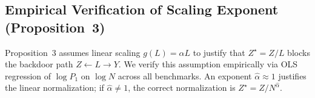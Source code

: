 \subsection{Empirical Verification of Scaling Exponent (Proposition~3)}
\label{sec:prop3_verification}

Proposition~3 assumes linear scaling $g(L) = \alpha L$ to justify that $Z^\star = Z/L$ blocks the backdoor path $Z \leftarrow L \rightarrow Y$. We verify this assumption empirically via OLS regression of $\log P_1$ on $\log N$ across all benchmarks. An exponent $\hat{\alpha} \approx 1$ justifies the linear normalization; if $\hat{\alpha} \neq 1$, the correct normalization is $Z^\star = Z / N^{\hat{\alpha}}$.

\begin{table}[ht]
\centering
\small
{}
\caption{\textbf{Empirical Scaling Exponent of 1D Persistence vs.\ Sequence Length.} OLS regression of $\log P_1$ on $\log N$ confirms the scaling assumed in Proposition~3. Exponents near 1.0 validate the linear normalization $Z^\star = Z/N$.}
\label{tab:scaling_regression}
\end{table}